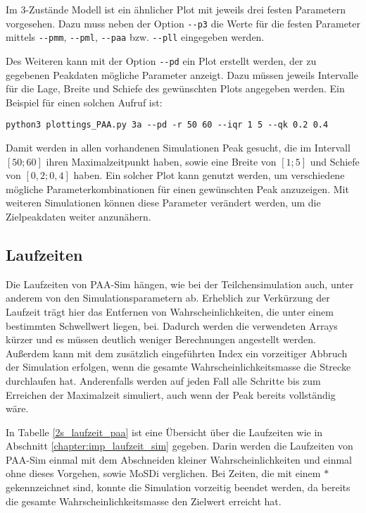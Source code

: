 Im 3-Zustände Modell ist ein ähnlicher Plot mit jeweils drei festen Parametern vorgesehen. Dazu muss neben der Option \verb!--p3! die Werte für die festen Parameter mittels \verb!--pmm!, \verb!--pml!, \verb!--paa! bzw. \verb!--pll! eingegeben werden.

Des Weiteren kann mit der Option \verb!--pd! ein Plot erstellt werden, der zu gegebenen Peakdaten mögliche Parameter anzeigt. Dazu müssen jeweils Intervalle für die Lage, Breite und Schiefe des gewünschten Plots angegeben werden.
Ein Beispiel für einen solchen Aufruf ist:
\begin{verbatim}
python3 plottings_PAA.py 3a --pd -r 50 60 --iqr 1 5 --qk 0.2 0.4
\end{verbatim}
Damit werden in allen vorhandenen Simulationen Peak gesucht, die im Intervall $[50; 60]$ ihren Maximalzeitpunkt haben, sowie eine Breite von $[1;5]$ und Schiefe von $[0,2; 0,4]$ haben. Ein solcher Plot kann genutzt werden, um verschiedene mögliche Parameterkombinationen für einen gewünschten Peak anzuzeigen. Mit weiteren Simulationen können diese Parameter verändert werden, um die Zielpeakdaten weiter anzunähern.


\subsection{Laufzeiten}
Die Laufzeiten von PAA-Sim hängen, wie bei der Teilchensimulation auch, unter anderem von den Simulationsparametern ab. Erheblich zur Verkürzung der Laufzeit trägt hier das Entfernen von Wahrscheinlichkeiten, die unter einem bestimmten Schwellwert liegen, bei. Dadurch werden die verwendeten Arrays kürzer und es müssen deutlich weniger Berechnungen angestellt werden. Außerdem kann mit dem zusätzlich eingeführten Index ein vorzeitiger Abbruch der Simulation erfolgen, wenn die gesamte Wahrscheinlichkeitsmasse die Strecke durchlaufen hat. Anderenfalls werden auf jeden Fall alle Schritte bis zum Erreichen der Maximalzeit simuliert, auch wenn der Peak bereits vollständig wäre.

In Tabelle \ref{2s_laufzeit_paa} ist eine Übersicht über die Laufzeiten wie in Abschnitt \ref{chapter:imp_laufzeit_sim} gegeben. Darin werden die Laufzeiten von PAA-Sim einmal mit dem Abschneiden kleiner Wahrscheinlichkeiten und einmal ohne dieses Vorgehen, sowie MoSDi verglichen. Bei Zeiten, die mit einem $*$ gekennzeichnet sind, konnte die Simulation vorzeitig beendet werden, da bereits die gesamte Wahrscheinlichkeitsmasse den Zielwert erreicht hat.


